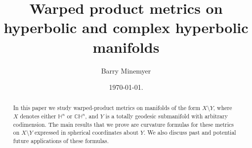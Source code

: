 \documentclass[10pt]{amsart}
\def\H{\mathbb{H}}
\def\C{\mathbb{C}}
\theoremstyle{definition}
\theoremstyle{remark}
\numberwithin{equation}{section}
\begin{document}
\title{Warped product metrics on hyperbolic and complex hyperbolic manifolds}

\author{Barry Minemyer}
\address{Department of Mathematical and Digital Sciences, Commonwealth University - Bloomsburg campus, Bloomsburg, Pennsylvania 17815}



\date{\today.}




\begin{abstract}
In this paper we study warped-product metrics on manifolds of the form $X \setminus Y$, where $X$ denotes either $\H^n$ or $\C \H^n$, and $Y$ is a totally geodesic submanifold with arbitrary codimension.  
The main results that we prove are curvature formulas for these metrics on $X \setminus Y$ expressed in spherical coordinates about $Y$.  
We also discuss past and potential future applications of these formulas.
\end{abstract}

\maketitle

\end{document}
